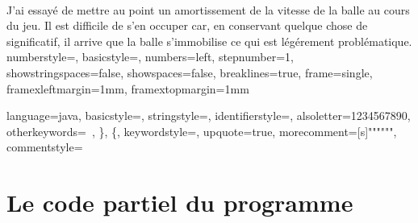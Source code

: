 \documentclass[a4paper,12pt]{report}
\begin{document}
\paragraph{}
J'ai essayé de mettre au point un amortissement de la vitesse de la balle au cours du jeu. Il est difficile de s'en occuper car, en conservant quelque chose de significatif, il arrive que la balle s'immobilise ce qui est légérement problématique.
\lstset
{
	numberstyle=\footnotesize,
	basicstyle=\ttfamily\footnotesize,
	numbers=left,
	stepnumber=1,
	showstringspaces=false,
	showspaces=false,
	breaklines=true,
	frame=single,
	framexleftmargin=1mm,
	framextopmargin=1mm
}


\lstset{language=Java}
\lstset
{
	language=java,
	basicstyle=\ttfamily\footnotesize,
	stringstyle=\color{red},
	identifierstyle=\color{black}, %
	alsoletter={1234567890},
	otherkeywords={\ , \}, \{},
	keywordstyle=\color{blue},
	upquote=true,
	morecomment=[s]{"""}{"""},
	commentstyle=\color{gray}\slshape
}

\part{Le code partiel du programme}
	\setcounter{chapter}{0}
	
	
\end{document}
